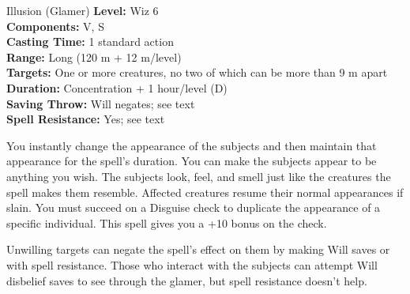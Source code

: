 {Illusion (Glamer)}
{
	\textbf{Level:}
	Wiz 6\\
	\textbf{Components:}
	V, S\\
	\textbf{Casting Time:}
	1 standard action\\
	\textbf{Range:}
	Long (120 m + 12 m/level)\\
	\textbf{Targets:}
	One or more creatures, no two of which can be more than 9 m apart\\
	\textbf{Duration:}
	Concentration + 1 hour/level (D)\\
	\textbf{Saving Throw:}
	Will negates; see text\\
	\textbf{Spell Resistance:}
	Yes; see text\\
}
{
	You instantly change the appearance of the subjects and then maintain that appearance for the spell's duration. You can make the subjects appear to be anything you wish. The subjects look, feel, and smell just like the creatures the spell makes them resemble. Affected creatures resume their normal appearances if slain. You must succeed on a Disguise check to duplicate the appearance of a specific individual. This spell gives you a +10 bonus on the check.

	Unwilling targets can negate the spell's effect on them by making Will saves or with spell resistance. Those who interact with the subjects can attempt Will disbelief saves to see through the glamer, but spell resistance doesn't help.

}
